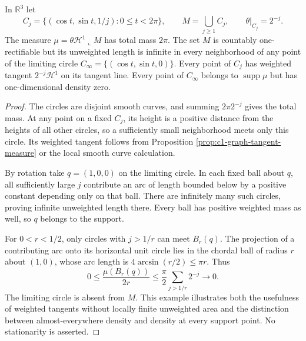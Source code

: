 \begin{example}\label{ex:weighted-accumulating-circles}
In $\mathbb R^3$ let
\[
 C_j=\{(\cos t,\sin t,1/j):0\leq t<2\pi\},\qquad
 M=\bigcup_{j\geq1}C_j,\qquad\theta|_{C_j}=2^{-j}.
\]
The measure $\mu=\theta\mathcal H^1\llcorner M$ has total mass $2\pi$. The set $M$ is countably one-rectifiable but its unweighted length is infinite in every neighborhood of any point of the limiting circle $C_\infty=\{(\cos t,\sin t,0)\}$. Every point of $C_j$ has weighted tangent $2^{-j}\mathcal H^1$ on its tangent line. Every point of $C_\infty$ belongs to $\operatorname{supp}\mu$ but has one-dimensional density zero.
\end{example}
\begin{proof}
The circles are disjoint smooth curves, and summing $2\pi2^{-j}$ gives the total mass. At any point on a fixed $C_j$, its height is a positive distance from the heights of all other circles, so a sufficiently small neighborhood meets only this circle. Its weighted tangent follows from Proposition \ref{prop:c1-graph-tangent-measure} or the local smooth curve calculation.

By rotation take $q=(1,0,0)$ on the limiting circle. In each fixed ball about $q$, all sufficiently large $j$ contribute an arc of length bounded below by a positive constant depending only on that ball. There are infinitely many such circles, proving infinite unweighted length there. Every ball has positive weighted mass as well, so $q$ belongs to the support.

For $0<r<1/2$, only circles with $j>1/r$ can meet $B_r(q)$. The projection of a contributing arc onto its horizontal unit circle lies in the chordal ball of radius $r$ about $(1,0)$, whose arc length is $4\arcsin(r/2)\leq\pi r$. Thus
\[
 0\leq\frac{\mu(B_r(q))}{2r}
 \leq\frac\pi2\sum_{j>1/r}2^{-j}\longrightarrow0.
\]
The limiting circle is absent from $M$. This example illustrates both the usefulness of weighted tangents without locally finite unweighted area and the distinction between almost-everywhere density and density at every support point. No stationarity is asserted.
\end{proof}

